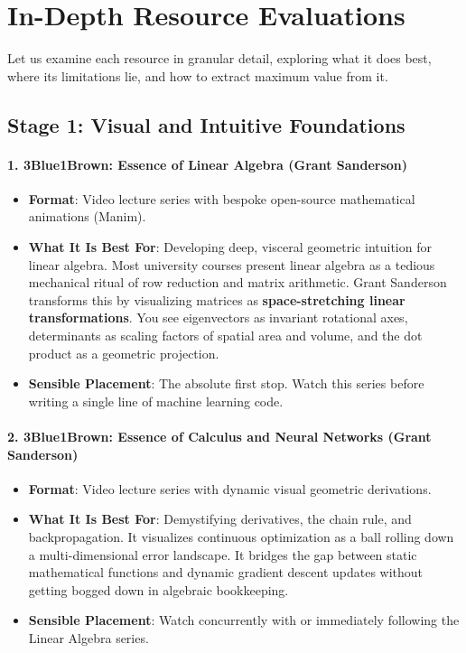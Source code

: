 \section{In-Depth Resource Evaluations}\label{sec:resource_reviews}

Let us examine each resource in granular detail, exploring what it does best, where its limitations lie, and how to extract maximum value from it.

\subsection{Stage 1: Visual and Intuitive Foundations}

\paragraph{1. 3Blue1Brown: Essence of Linear Algebra (Grant Sanderson)}
\begin{itemize}
    \item \textbf{Format}: Video lecture series with bespoke open-source mathematical animations (Manim).
    \item \textbf{What It Is Best For}: Developing deep, visceral geometric intuition for linear algebra. Most university courses present linear algebra as a tedious mechanical ritual of row reduction and matrix arithmetic. Grant Sanderson transforms this by visualizing matrices as \textbf{space-stretching linear transformations}. You see eigenvectors as invariant rotational axes, determinants as scaling factors of spatial area and volume, and the dot product as a geometric projection.
    \item \textbf{Sensible Placement}: The absolute first stop. Watch this series before writing a single line of machine learning code.
\end{itemize}

\paragraph{2. 3Blue1Brown: Essence of Calculus and Neural Networks (Grant Sanderson)}
\begin{itemize}
    \item \textbf{Format}: Video lecture series with dynamic visual geometric derivations.
    \item \textbf{What It Is Best For}: Demystifying derivatives, the chain rule, and backpropagation. It visualizes continuous optimization as a ball rolling down a multi-dimensional error landscape. It bridges the gap between static mathematical functions and dynamic gradient descent updates without getting bogged down in algebraic bookkeeping.
    \item \textbf{Sensible Placement}: Watch concurrently with or immediately following the Linear Algebra series.
\end{itemize}

